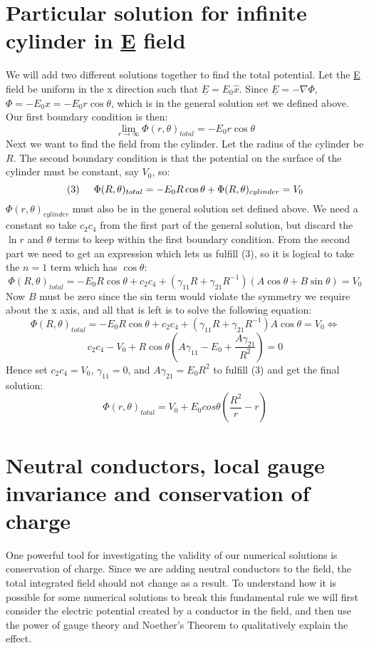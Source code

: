 \documentclass[a4paper,10pt]{article}
\begin{document}
\section*{Particular solution for infinite cylinder in \underline{E} field}
We will add two different solutions together to find the total potential. Let the \underline{E} field be uniform in the x direction
such that $\underline{E} = E_0 \hat{x}$. Since $\underline{E} = - \nabla \Phi$, $\Phi = -E_0 x = -E_0 r \cos\theta$, which is
in the general solution set we defined above.
Our first
boundary condition is then:
\[ \lim_{r \rightarrow \infty} \Phi(r,\theta)_{total} = -E_0 r \cos\theta \]
Next we want to find the field from the cylinder. Let the radius of the cylinder be $R$.
The second boundary condition is that the potential on the surface of the cylinder must be constant,
say $V_0$, so:
\[ (3) \hspace{0.5cm} \Phi(R,\theta)_{total} = -E_0 R \cos\theta + \Phi(R,\theta)_{cylinder} = V_0 \]
$\Phi(r,\theta)_{cylinder}$ must also be in the general solution set defined above. We need a constant so take $c_2 c_4$ from the first
part of the general solution, but discard the
$\ln r$ and $\theta$ terms to keep within the first boundary condition.
From the second part we need to get an expression which lets us fulfill (3), so it is logical to take the $n = 1$ term which has $\cos\theta$:
\[ \Phi(R,\theta)_{total} = -E_0 R \cos\theta +  c_2 c_4 + (\gamma_{11} R + \gamma_{21} R^{-1}) (A\cos\theta + B \sin\theta) = V_0 \]
Now $B$ must be zero since the sin term would violate the symmetry we require about the x axis, and all that is left is to solve the following equation:
\[ \Phi(R,\theta)_{total} = -E_0 R \cos\theta + c_2 c_4 + (\gamma_{11} R + \gamma_{21} R^{-1}) A\cos\theta = V_0 \Leftrightarrow \]
\[ c_2 c_4 - V_0 + R \cos\theta \left( A\gamma_{11} - E_0 + \frac{A\gamma_{21}}{R^2} \right) = 0 \]
Hence set $c_2 c_4 = V_0$, $\gamma_{11} = 0$, and $A\gamma_{21} = E_0 R^2$ to fulfill (3) and get the final solution:
\[ \Phi(r,\theta)_{total} = V_0 + E_0 cos\theta \left( \frac{R^2}{r} - r \right) \]

\newpage
\thispagestyle{empty}
\section*{Neutral conductors, local gauge invariance and conservation of charge}

One powerful tool for investigating the validity of our numerical solutions is conservation of charge. Since we are adding neutral conductors to the field, the total integrated field should not change as a result. To understand how it is possible for some numerical solutions to break this fundamental rule we will first consider the electric potential created by a conductor in the field, and then use the power of gauge theory and Noether's Theorem to qualitatively explain the effect.
\end{document}
